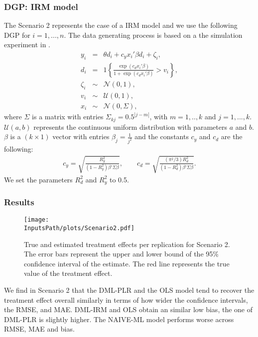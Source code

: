 \documentclass[10pt]{article}
\newcommand*{\InputsFolderPath}{C:/DEV/DML/src/data/}
\newcommand*{\InputsPath}{\InputsFolderPath/20221110/}
\begin{document}
\subsubsection{DGP: IRM model}
The Scenario 2 represents the case of a IRM model and we use the following DGP for $i=1,...,n$.
The data generating process is based on a the simulation experiment in \cite{Bell2017}.
\begin{eqnarray*}\label{dgp_3.1}
	y_i &=& \theta d_i + c_y x_i' \beta d_i + \zeta_i, \\
	d_i &=& 1\left\lbrace \frac{\exp(c_d x_i' \beta)}{1+\exp(c_d x_i' \beta)} > v_i \right\rbrace, \\
	\zeta_i &\sim& \mathcal{N}(0,1), \\	
	v_i
	&\sim& \mathcal{U}(0,1),\\
	x_i &\sim& \mathcal{N}(0, \Sigma),
\end{eqnarray*}
where $\Sigma$ is a matrix with entries $\Sigma_{kj} = 0.5^{|j-m|}$, with $m=1,..,k$ and $j=1,...,k$.
$\mathcal{U}(a,b)$ represents the continuous uniform distribution with parameters $a$ and $b$.
$\beta$ is a $(k\times 1)$ vector with entries $\beta_j=\frac{1}{j^2}$ and the constants $c_y$ and $c_d$ are the following:
\begin{eqnarray*}\label{dgp_3.2}
	c_y = \sqrt{\frac{R_y^2}{(1-R_y^2) \beta' \Sigma \beta}}, \qquad 
	c_d =\sqrt{\frac{(\pi^2 /3) R_d^2}{(1-R_d^2) \beta' \Sigma \beta}}.
\end{eqnarray*}
We set the parameters $R^2_d$ and $R^2_y$ to 0.5.
\subsubsection{Results}
\begin{figure}[H]
	\begin{center}
		\texttt{[image: \\InputsPath/plots/Scenario2.pdf]}
		\caption{True and estimated treatment effects per replication for Scenario 2. The error bars represent the upper and lower bound of the 95\% confidence interval of the estimate. The red line represents the true value of the treatment effect.}
		\label{Scenario2}
	\end{center}
\end{figure}

We find in Scenario 2 that the DML-PLR and the OLS model tend to recover the treatment effect overall similarly in terms of how wider the confidence intervals, the RMSE, and MAE. 
DML-IRM and OLS obtain an similar low bias, the one of DML-PLR is slightly higher.
The NAIVE-ML model performs worse across RMSE, MAE and bias.
\end{document}
